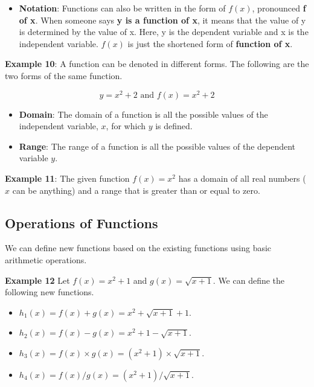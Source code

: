 \documentclass[
]{book}
\providecommand{\tightlist}{%
  \setlength{\itemsep}{0pt}\setlength{\parskip}{0pt}}
\begin{document}
\begin{itemize}
\tightlist
\item
  \textbf{Notation}: Functions can also be written in the form of \(f(x)\), pronounced \textbf{f of x}. When someone says \textbf{y is a function of x}, it means that the value of y is determined by the value of x. Here, y is the dependent variable and x is the independent variable. \(f(x)\) is just the shortened form of \textbf{function of x}.
\end{itemize}

\textbf{Example 10}: A function can be denoted in different forms. The following are the two forms of the same function.

\[
y = x^2 + 2 \mbox{   and   } f(x) = x^2 + 2\]

\begin{itemize}
\item
  \textbf{Domain}: The domain of a function is all the possible values of the independent variable, \(x\), for which \(y\) is defined.
\item
  \textbf{Range}: The range of a function is all the possible values of the dependent variable \(y\).
\end{itemize}

\textbf{Example 11}: The given function \(f(x) = x^2\) has a domain of all real numbers (\(x\) can be anything) and a range that is greater than or equal to zero.

\hypertarget{operations-of-functions}{%
\subsection{Operations of Functions}\label{operations-of-functions}}

We can define new functions based on the existing functions using basic arithmetic operations.

\textbf{Example 12} Let \(f(x) = x^2 + 1\) and \(g(x) = \sqrt{x+1}\). We can define the following new functions.

\begin{itemize}
\item
  \(h_1(x) = f(x) + g(x) = x^2 + \sqrt{x+1} + 1\).
\item
  \(h_2(x) = f(x) - g(x) = x^2 + 1 -\sqrt{x+1}\).
\item
  \(h_3(x) = f(x)\times g(x) = (x^2 + 1)\times \sqrt{x+1}\).
\item
  \(h_4(x) = f(x) / g(x) = (x^2 + 1)/\sqrt{x+1}\).
\end{itemize}
\end{document}
